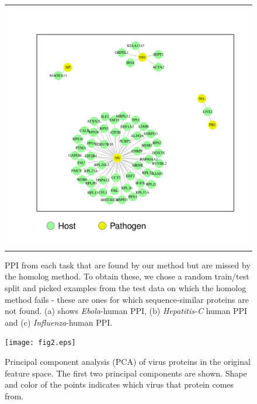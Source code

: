 \documentclass{bioinfo}
\begin{document}
\begin{figure}
\begin{tabular}{c}
\begin{minipage}{\textwidth}
\begin{center}
\includegraphics[scale=0.35, trim = 0.2 0.2 0.2 0.2]{flunet.pdf}
\end{center}
\end{minipage}
\end{tabular}
\caption{PPI from each task that are found by our method but are missed by the homolog method. To obtain these, we chose a random train/test split and picked examples from the test data on which the homolog method fails - these are ones for which sequence-similar proteins are not found. (a) shows \textit{Ebola}-human PPI, (b) \textit{Hepatitis-C} human PPI and (c) \textit{Influenza}-human PPI.}
\label{fig:network}
\end{figure}


\begin{figure}
\centering
\texttt{[image: fig2.eps]}
\caption{Principal component analysis (PCA) of virus proteins in the original feature space. The first two principal components are shown. Shape and color of the points indicates which virus that protein comes from.}%
\label{fig:pca1}
\end{figure}
\end{document}
